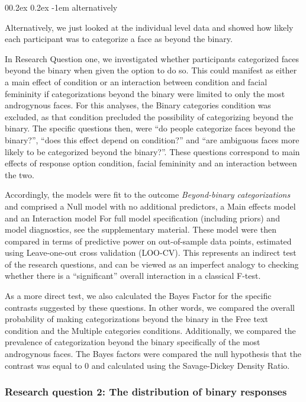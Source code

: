 \documentclass[
  man]{apa7}
\makeatletter
\let\oldparagraph\paragraph
\renewcommand{\paragraph}[1]{\oldparagraph{#1}\mbox{}}
\renewcommand{\paragraph}{\@startsection{paragraph}{4}{\parindent}%
  {0\baselineskip \@plus 0.2ex \@minus 0.2ex}%
  {-1em}%
  {\normalfont\normalsize\bfseries\itshape\typesectitle}}
\renewcommand{\paragraph}{\@startsection{paragraph}{4}{\parindent}%
  {0\baselineskip \@plus 0.2ex \@minus 0.2ex}%
  {-1em}%
  {\normalfont\normalsize\bfseries\typesectitle}}
\makeatother
\begin{document}
\hypertarget{alternatively}{%
\paragraph{alternatively}\label{alternatively}}

Alternatively, we just looked at the individual level data and showed how likely each participant was to categorize a face as beyond the binary.

In Research Question one, we investigated whether participants categorized faces beyond the binary when given the option to do so. This could manifest as either a main effect of condition or an interaction between condition and facial femininity if categorizations beyond the binary were limited to only the most androgynous faces. For this analyses, the Binary categories condition was excluded, as that condition precluded the possibility of categorizing beyond the binary. The specific questions then, were ``do people categorize faces beyond the binary?'', ``does this effect depend on condition?'' and ``are ambiguous faces more likely to be categorized beyond the binary?''. These questions correspond to main effects of response option condition, facial femininity and an interaction between the two.

Accordingly, the models were fit to the outcome \emph{Beyond-binary categorizations} and comprised a Null model with no additional predictors, a Main effects model and an Interaction model For full model specification (including priors) and model diagnostics, see the supplementary material. These model were then compared in terms of predictive power on out-of-sample data points, estimated using Leave-one-out cross validation (LOO-CV). This represents an indirect test of the research questions, and can be viewed as an imperfect analogy to checking whether there is a ``significant'' overall interaction in a classical F-test.

As a more direct test, we also calculated the Bayes Factor for the specific contrasts suggested by these questions. In other words, we compared the overall probability of making categorizations beyond the binary in the Free text condition and the Multiple categories conditions. Additionally,
we compared the prevalence of categorization beyond the binary specifically of the most androgynous faces. The Bayes factors were compared the null hypothesis that the contrast was equal to 0 and calculated using the Savage-Dickey Density Ratio.

\hypertarget{research-question-2-the-distribution-of-binary-responses}{%
\subsubsection{Research question 2: The distribution of binary responses}\label{research-question-2-the-distribution-of-binary-responses}}
\end{document}
